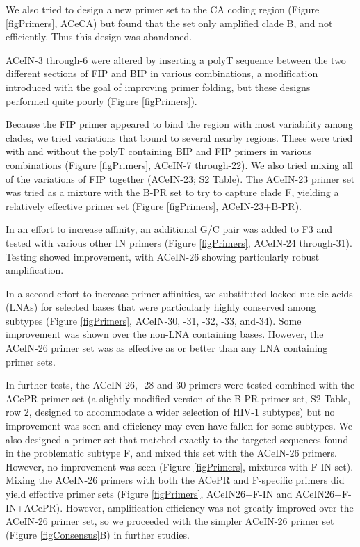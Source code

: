 \documentclass[../sherrill-Mix_thesis.tex]{subfiles}
\begin{document}
			We also tried to design a new primer set to the CA coding region (Figure \ref{figPrimers}, ACeCA) but found that the set only amplified clade B, and not efficiently. Thus this design was abandoned.

			ACeIN-3 through-6 were altered by inserting a polyT sequence between the two different sections of FIP and BIP in various combinations, a modification introduced with the goal of improving primer folding, but these designs performed quite poorly (Figure \ref{figPrimers}).

			Because the FIP primer appeared to bind the region with most variability among clades, we tried variations that bound to several nearby regions. These were tried with and without the polyT containing BIP and FIP primers in various combinations (Figure \ref{figPrimers}, ACeIN-7 through-22). We also tried mixing all of the variations of FIP together (ACeIN-23; S2 Table). The ACeIN-23 primer set was tried as a mixture with the B-PR set to try to capture clade F, yielding a relatively effective primer set (Figure \ref{figPrimers}, ACeIN-23+B-PR).

			In an effort to increase affinity, an additional G/C pair was added to F3 and tested with various other IN primers (Figure \ref{figPrimers}, ACeIN-24 through-31). Testing showed improvement, with ACeIN-26 showing particularly robust amplification.

			In a second effort to increase primer affinities, we substituted locked nucleic acids (LNAs) for selected bases that were particularly highly conserved among subtypes (Figure \ref{figPrimers}, ACeIN-30, -31, -32, -33, and-34). Some improvement was shown over the non-LNA containing bases. However, the ACeIN-26 primer set was as effective as or better than any LNA containing primer sets.

			In further tests, the ACeIN-26, -28 and-30 primers were tested combined with the ACePR primer set (a slightly modified version of the B-PR primer set, S2 Table, row 2, designed to accommodate a wider selection of HIV-1 subtypes) but no improvement was seen and efficiency may even have fallen for some subtypes. We also designed a primer set that matched exactly to the targeted sequences found in the problematic subtype F, and mixed this set with the ACeIN-26 primers. However, no improvement was seen (Figure \ref{figPrimers}, mixtures with F-IN set). Mixing the ACeIN-26 primers with both the ACePR and F-specific primers did yield effective primer sets (Figure \ref{figPrimers}, ACeIN26+F-IN and ACeIN26+F-IN+ACePR). However, amplification efficiency was not greatly improved over the ACeIN-26 primer set, so we proceeded with the simpler ACeIN-26 primer set (Figure \ref{figConsensus}B) in further studies.
\end{document}
